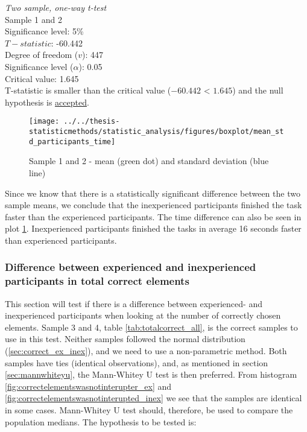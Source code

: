  \begin{center}
	\begin{tcolorbox}[width=0.8\textwidth]
		\centering
		\textit{Two sample, one-way t-test}\\
		Sample 1 and 2\\
		Significance level: 5\%  \\[0.5cm]
		
		$T-statistic$: -60.442 \\
		Degree of freedom ($v$): 447 \\ %
		Significance level ($\alpha$): 0.05 \\
		Critical value: 1.645\\[0.2cm]
		
		T-statistic is smaller than the critical value ($-60.442$ < $1.645$) and the null hypothesis is \underline{accepted}.\\[0.5cm]
	\end{tcolorbox} 
\end{center}

\begin{figure}[H]
	\centering
	\texttt{[image: ../../thesis-statisticmethods/statistic\_analysis/figures/boxplot/mean\_std\_participants\_time]}
	\caption{Sample 1 and 2 - mean (green dot) and standard deviation (blue line)}
	\label{fig:meanstdparticipantstime}
\end{figure}

Since we know that there is a statistically significant difference between the two sample means, we conclude that the inexperienced participants finished the task faster than the experienced participants. The time difference can also be seen in plot \ref{fig:meanstdparticipantstime}. Inexperienced participants finished the tasks in average 16 seconds faster than experienced participants.\newline

\subsubsection[Sample 3, 4]{Difference between experienced and inexperienced participants in total correct elements} %

This section will test if there is a difference between experienced- and inexperienced participants when looking at the number of correctly chosen elements. Sample 3 and 4, table \ref{tab:totalcorrect_all}, is the correct samples to use in this test. Neither samples followed the normal distribution (\ref{sec:correct_ex_inex}), and we need to use a non-parametric method. Both samples have ties (identical observations), and, as mentioned in section \ref{sec:mannwhiteyu}, the Mann-Whitey U test is then preferred. From histogram \ref{fig:correctelementswasnotinterupter_ex} and \ref{fig:correctelementswasnotinterupted_inex} we see that the samples are identical in some cases. Mann-Whitey U test should, therefore, be used to compare the population medians. The hypothesis to be tested is:\\[0.3cm]

